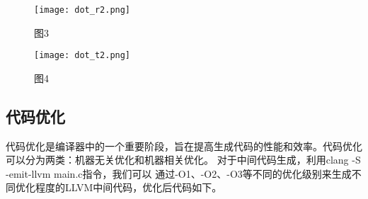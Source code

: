 \documentclass[UTF8,a4paper,10pt]{ctexart}
\begin{document}
\begin{figure}[H]
  \centering
  \begin{minipage}[t]{0.48\textwidth}
    \centering
    \texttt{[image: dot\_r2.png]}
    \caption{图3}
    
  \end{minipage}%
  \hfill
  \begin{minipage}[t]{0.48\textwidth}
    \centering
    \texttt{[image: dot\_t2.png]}
    \caption{图4}
    
  \end{minipage}
  \label{fig:o2}
\end{figure}
\subsection{代码优化}
代码优化是编译器中的一个重要阶段，旨在提高生成代码的性能和效率。代码优化可以分为两类：机器无关优化和机器相关优化。
对于中间代码生成，利用clang -S -emit-llvm main.c指令，我们可以
通过-O1、-O2、-O3等不同的优化级别来生成不同优化程度的LLVM中间代码，优化后代码如下。
\end{document}
